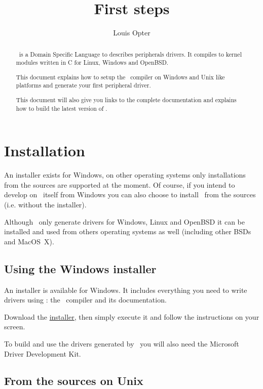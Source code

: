 \documentclass[american]{rtxarticle}
\title{First steps}
\author{Louis Opter}
\begin{document}
\maketitle

\begin{abstract}
\rtx\ is a Domain Specific Language to describes peripherals drivers. It
compiles to kernel modules written in C for Linux, Windows and OpenBSD.

This document explains how to setup the \rtx\ compiler on Windows and Unix like
platforms and generate your first peripheral driver.

This document will also give you links to the complete documentation and
explains how to build the latest version of \rtx.
\end{abstract}

\tableofcontents

\pagebreak

\section{Installation}

An installer exists for Windows, on other operating systems only installations
from the sources are supported at the moment. Of course, if you intend to
develop on \rtx\ itself from Windows you can also choose to install \rtx\ from
the sources (i.e. without the installer).

Although \rtx\ only generate drivers for Windows, Linux and OpenBSD it can be
installed and used from others operating systems as well (including other BSDs
and MacOS~X).

\subsection{Using the Windows installer}

An installer is available for Windows. It includes everything you need to write
drivers using \rtx: the \rtx\ compiler and its documentation.

Download the \href{http://rathaxes.googlecode.com/files/rathaxes-latest.exe}{installer},
then simply execute it and follow the instructions on your screen.

To build and use the drivers generated by \rtx\ you will also need the
Microsoft Driver Development Kit.

\subsection{From the sources on Unix}
\end{document}

